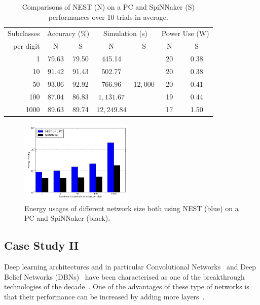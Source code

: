 \documentclass{frontiersENG} %
\begin{document}
\begin{table}[h]
	\caption{Comparisons of NEST (N) on a PC and SpiNNaker (S) performances over 10 trials in average.}
	\begin{center}
		\begin{tabular} {r|c|c|c|c|c|c}
			Subclasses
			&\multicolumn{2}{c|}{Accuracy (\%)}  &\multicolumn{2}{c|}{Simulation (s)}
			&\multicolumn{2}{c}{Power Use (W)}   \\
			\cline{2-7}
			per digit
			& N & S & N & S & N & S\\
			\hline
			1 & 79.63 & 79.50 & 445.14 & \multirow{5}{*}{$12,000$} &20 & 0.38 \\
			10 & 91.42 & 91.43 & 502.77 &   & 20  & 0.38 \\
			50 & 93.06 & 92.92 & $766.96$ &   & 20  & 0.41 \\
			100 & 87.04 & 86.83 & $1,131.67$ &   &  19 & 0.44 \\
			1000 & 89.63 & 89.74 & $12,249.84$ &   &  17  & 1.50 \\
			
		\end{tabular}
		\label{tbl:compare}
	\end{center}
\end{table}

\begin{figure}[hbt!]
	\centering
	\includegraphics[width=0.48\textwidth]{fig8}
	\caption{Energy usages of different network size both using NEST (blue) on a PC and SpiNNaker (black).}
	\label{fig:energy}
\end{figure}
\subsection{Case Study II}
Deep learning architectures and in particular Convolutional Networks~\citep{lecun1998gradient} and Deep Belief Networks (DBNs)~\citep{hinton2006fast} have been characterised as one of the breakthrough technologies of the decade~\citep{MIT_TechReview}. One of the advantages of these type of networks is that their performance can be increased by adding more layers~\citep{hinton2006fast}.
\end{document}

